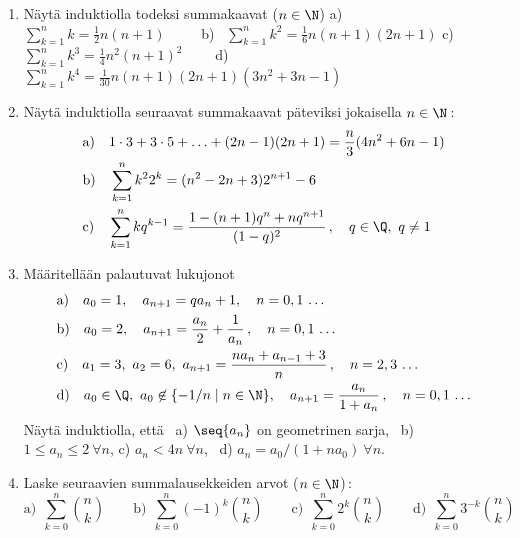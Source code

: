 \Harj
\begin{enumerate}

\item
Näytä induktiolla todeksi summakaavat ($n\in\N$) \vspace{1mm}\newline
a) \ $\sum_{k=1}^n k = \frac{1}{2} n(n+1) \qquad\ $
b) \ $\sum_{k=1}^n k^2 = \frac{1}{6} n(n+1)(2n+1)$ \vspace{1mm}\newline 
c) \ $\sum_{k=1}^n k^3 = \frac {1}{4} n^2(n+1)^2 \qquad$
d) \ $\sum_{k=1}^n k^4 = \frac{1}{30} n(n+1)(2n+1)(3n^2+3n-1)$

\item
Näytä induktiolla seuraavat summakaavat päteviksi jokaisella $n\in\N$\,:
\begin{align*}
&\text{a)} \quad 1 \cdot 3 + 3 \cdot 5 + \ldots + (2n-1)(2n+1) = \frac{n}{3}(4n^2+6n-1) \\
&\text{b)} \quad \sum_{k=1}^n k^2 2^k = (n^2-2n+3)2^{n+1}-6 \\
&\text{c)} \quad \sum_{k=1}^n kq^{k-1} 
                          = \frac{1-(n+1)q^n+nq^{n+1}}{(1-q)^2}\,, \quad q\in\Q,\ q \neq 1
\end{align*}

\item \label{jono-H4}
Määritellään palautuvat lukujonot
\begin{align*}
&\text{a)} \quad a_0=1, \quad a_{n+1} = qa_n + 1, \quad n=0,1\,\ldots \\
&\text{b)} \quad a_0=2, \quad a_{n+1} = \frac{a_n}{2} + \frac{1}{a_n}\,, \quad n=0,1\,\ldots \\
&\text{c)} \quad a_1=3,\ a_2=6,\ a_{n+1} = \frac{na_n+a_{n-1}+3}{n}\,, \quad n=2,3\,\ldots \\
&\text{d)} \quad a_0\in\Q,\ a_0 \not\in \{-1/n \mid n\in\N\}, \quad 
                            a_{n+1} = \frac{a_n}{1+a_n}\,, \quad n=0,1\,\ldots
\end{align*}
Näytä induktiolla, että \ a) $\seq{a_n}$ on geometrinen sarja, \ 
b) $1 \le a_n \le 2\ \forall n$, \newline
c) $a_n < 4n\ \forall n$, \ d) $a_n=a_0/(1+na_0)\ \forall n$.

\item
Laske seuraavien summalausekkeiden arvot ($n\in\N$)\,:
\[
\text{a)}\ \ \sum_{k=0}^n \binom{n}{k} \qquad 
\text{b)}\ \ \sum_{k=0}^n (-1)^k \binom{n}{k} \qquad
\text{c)}\ \ \sum_{k=0}^n 2^k\binom{n}{k} \qquad
\text{d)}\ \ \sum_{k=0}^n 3^{-k}\binom{n}{k}
\]


\end{enumerate}

